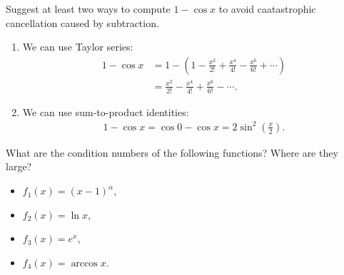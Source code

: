 \documentclass[11pt]{elegantbook}
\begin{document}
\vspace{1em}

\begin{problem}
  Suggest at least two ways to compute $1-\cos x$ to avoid caatastrophic cancellation caused by subtraction.
\end{problem}

\begin{solution}
  \begin{enumerate}[(1)]
    \item We can use Taylor series:
    \begin{align*}
      1-\cos x&=1-\left(1-\frac{x^2}{2!}+\frac{x^4}{4!}-\frac{x^6}{6!}+\cdots\right)\\
      &=\frac{x^2}{2!}-\frac{x^4}{4!}+\frac{x^6}{6!}-\cdots.
    \end{align*}

    \item We can use sum-to-product identities:
    \begin{align*}
      1-\cos x= \cos 0- \cos x= 2\sin^2\left(\frac{x}{2}\right).
    \end{align*}
  \end{enumerate}
\end{solution}

\vspace{1em}

\begin{problem}
  What are the condition numbers of the following functions? Where are they large?
  \begin{itemize}
    \item $f_1(x)=(x-1)^\alpha$,
    \item $f_2(x)=\ln x$,
    \item $f_3(x)=e^x$,
    \item $f_4(x)=\arccos x$.
  \end{itemize}
\end{problem}
\end{document}
